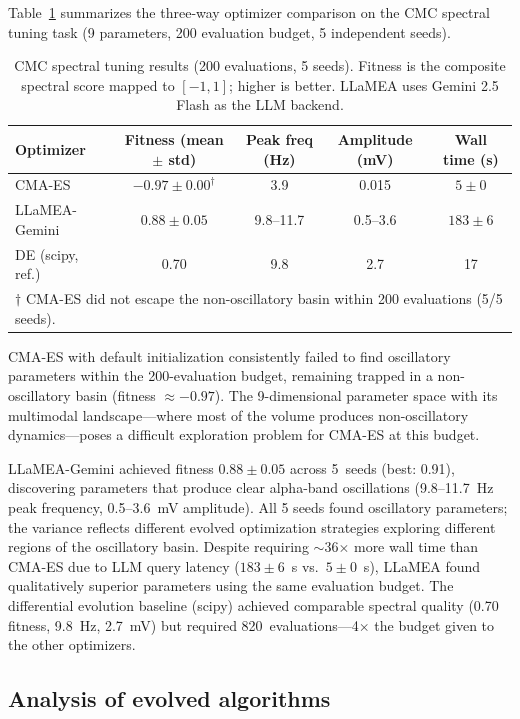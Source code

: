 \documentclass[11pt,a4paper]{article}
\begin{document}
Table~\ref{tab:cmc_results} summarizes the three-way optimizer comparison on the CMC spectral tuning task (9 parameters, 200 evaluation budget, 5 independent seeds).

\begin{table}[h]
\centering
\caption{CMC spectral tuning results (200 evaluations, 5 seeds). Fitness is the composite spectral score mapped to $[-1, 1]$; higher is better. LLaMEA uses Gemini 2.5 Flash as the LLM backend.}
\label{tab:cmc_results}
\begin{tabular}{@{}lcccc@{}}
\toprule
Optimizer & Fitness (mean $\pm$ std) & Peak freq (Hz) & Amplitude (mV) & Wall time (s) \\
\midrule
CMA-ES          & $-0.97 \pm 0.00^\dagger$  & 3.9   & 0.015  & $5 \pm 0$ \\
LLaMEA-Gemini   & $\mathbf{0.88 \pm 0.05}$  & 9.8--11.7 & 0.5--3.6 & $183 \pm 6$ \\
DE (scipy, ref.) & 0.70                      & 9.8   & 2.7    & 17 \\
\bottomrule
\multicolumn{5}{l}{\footnotesize $\dagger$ CMA-ES did not escape the non-oscillatory basin within 200 evaluations (5/5 seeds).}
\end{tabular}
\end{table}

CMA-ES with default initialization consistently failed to find oscillatory parameters within the 200-evaluation budget, remaining trapped in a non-oscillatory basin (fitness $\approx -0.97$).
The 9-dimensional parameter space with its multimodal landscape—where most of the volume produces non-oscillatory dynamics—poses a difficult exploration problem for CMA-ES at this budget.

LLaMEA-Gemini achieved fitness $0.88 \pm 0.05$ across 5~seeds (best: 0.91), discovering parameters that produce clear alpha-band oscillations (9.8--11.7~Hz peak frequency, 0.5--3.6~mV amplitude).
All 5 seeds found oscillatory parameters; the variance reflects different evolved optimization strategies exploring different regions of the oscillatory basin.
Despite requiring $\sim$36$\times$ more wall time than CMA-ES due to LLM query latency ($183 \pm 6$~s vs.\ $5 \pm 0$~s), LLaMEA found qualitatively superior parameters using the same evaluation budget.
The differential evolution baseline (scipy) achieved comparable spectral quality (0.70 fitness, 9.8~Hz, 2.7~mV) but required 820~evaluations---4$\times$ the budget given to the other optimizers.

\subsection{Analysis of evolved algorithms}
\end{document}
